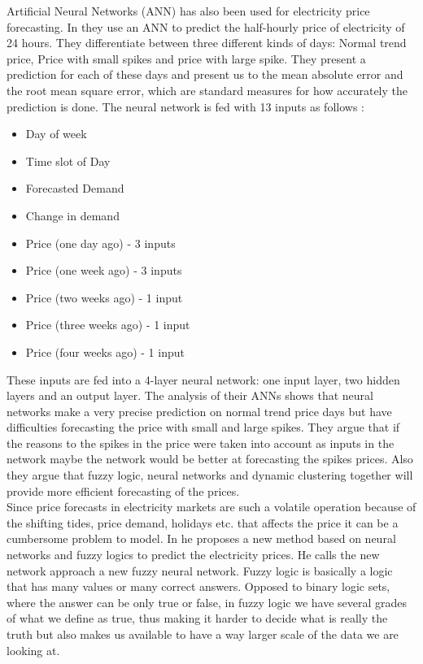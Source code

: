 Artificial Neural Networks (ANN) has also been used for electricity price forecasting. In \cite{singhal2011electricity} they use an ANN to predict the half-hourly price of electricity of 24 hours. They differentiate between three different kinds of days: Normal trend price, Price with small spikes and price with large spike. They present a prediction for each of these days and present us to the mean absolute error and the root mean square error, which are standard measures for how accurately the prediction is done. The neural network is fed with 13 inputs as follows \cite{singhal2011electricity}:
\begin{itemize}[noitemsep,topsep=3pt,parsep=2pt,partopsep=3pt]
\item Day of week
\item Time slot of Day
\item Forecasted Demand
\item Change in demand
\item Price (one day ago) - 3 inputs 
\item Price (one week ago) - 3 inputs
\item Price (two weeks ago) - 1 input 
\item Price (three weeks ago) - 1 input 
\item Price (four weeks ago) - 1 input
\end{itemize}
These inputs are fed into a 4-layer neural network: one input layer, two hidden layers and an output layer. The analysis of their ANNs shows that neural networks make a very precise prediction on normal trend price days but have difficulties forecasting the price with small and large spikes. They argue that if the reasons to the spikes in the price were taken into account as inputs in the network maybe the network would be better at forecasting the spikes prices. Also they argue that fuzzy logic, neural networks and dynamic clustering together will provide more efficient forecasting of the prices.
\\[0.5cm]
Since price forecasts in electricity markets are such a volatile operation because of the shifting tides, price demand, holidays etc. that affects the price it can be a cumbersome problem to model. In \cite{amjady2006day} he proposes a new method based on neural networks and fuzzy logics to predict the electricity prices. He calls the new network approach a new fuzzy neural network. Fuzzy logic is basically a logic that has many values or many correct answers. Opposed to binary logic sets, where the answer can be only true or false, in fuzzy logic we have several grades of what we define as true, thus making it harder to decide what is really the truth but also makes us available to have a way larger scale of the data we are looking at.

